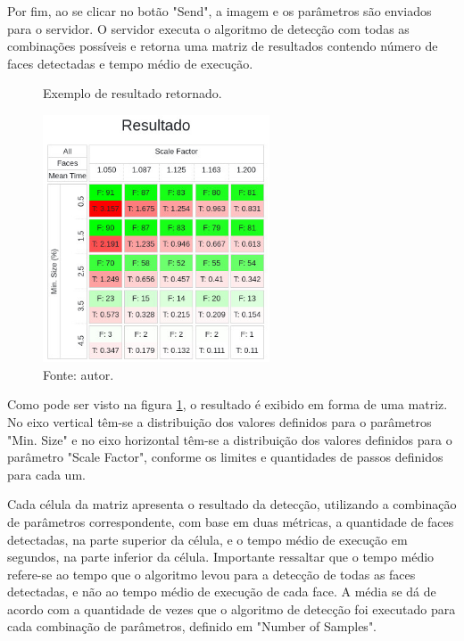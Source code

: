 Por fim, ao se clicar no botão "Send", a imagem e os parâmetros são enviados para o servidor. O servidor executa o algoritmo de detecção com todas as combinações possíveis e retorna uma matriz de resultados contendo número de faces detectadas e tempo médio de execução.

\begin{figure}[h]
    \centering
    \caption[Exemplo de resultado retornado.]{Exemplo de resultado retornado.}
    \includegraphics[width=0.6\textwidth]{Cap3_Desenvolvimento/Figures/exemplo_resultado_matriz.jpg}
    \caption*{Fonte: autor.}
    \label{fig:matrizResultado}
\end{figure}

Como pode ser visto na figura \ref{fig:matrizResultado}, o resultado é exibido em forma de uma matriz. No eixo vertical têm-se a distribuição dos valores definidos para o parâmetros "Min. Size" e no eixo horizontal têm-se a distribuição dos valores definidos para o parâmetro "Scale Factor", conforme os limites e quantidades de passos definidos para cada um.

Cada célula da matriz apresenta o resultado da detecção, utilizando a combinação de parâmetros correspondente, com base em duas métricas, a quantidade de faces detectadas, na parte superior da célula, e o tempo médio de execução em segundos, na parte inferior da célula. Importante ressaltar que o tempo médio refere-se ao tempo que o algoritmo levou para a detecção de todas as faces detectadas, e não ao tempo médio de execução de cada face. A média se dá de acordo com a quantidade de vezes que o algoritmo de detecção foi executado para cada combinação de parâmetros, definido em "Number of Samples".

